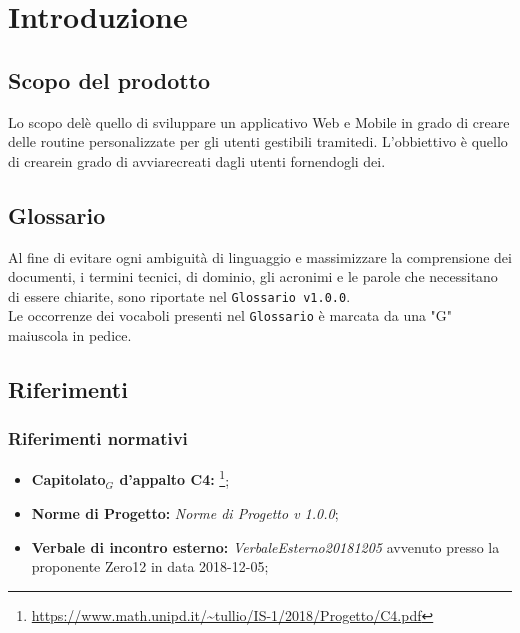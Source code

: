 \chapter{Introduzione}

\section{Scopo del prodotto}
Lo scopo delè quello di sviluppare un applicativo Web e Mobile in grado di creare delle routine personalizzate per gli utenti gestibili tramitedi. L'obbiettivo è quello di crearein grado di avviarecreati dagli utenti fornendogli dei.
\section{Glossario}
Al fine di evitare ogni ambiguità di linguaggio e massimizzare la comprensione dei documenti, i termini tecnici, di dominio, gli acronimi e le parole che necessitano di essere chiarite, sono riportate nel \texttt{Glossario v1.0.0}.\\
Le occorrenze dei vocaboli presenti nel \texttt{Glossario} è marcata da una "G" maiuscola in pedice.

\section{Riferimenti}

\subsection{Riferimenti normativi}
\begin{itemize}
	
	\item \textbf{Capitolato$_{G}$ d'appalto C4:} \footnote{\url{https://www.math.unipd.it/~tullio/IS-1/2018/Progetto/C4.pdf}};
	\item \textbf{Norme di Progetto:} \textit{Norme di Progetto v 1.0.0};
	\item \textbf{Verbale di incontro esterno:} \textit{VerbaleEsterno20181205} avvenuto presso la proponente Zero12 in data 2018-12-05;

\end{itemize}

